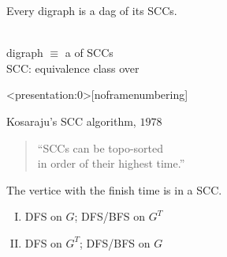 
\begin{frame}{}
  \begin{theorem}
    Every digraph is a dag of its SCCs.
  \end{theorem}

  \pause
  \vspace{0.60cm}
  \begin{center}
     \\[15pt] 

    digraph $\equiv$ a  of SCCs \\[6pt]

    SCC: equivalence class over 
  \end{center}
\end{frame}

\begin{frame}<presentation:0>[noframenumbering]
  \centerline{}

  \vspace{0.50cm}
  \begin{exampleblock}{Kosaraju's SCC algorithm, $1978$}
    \begin{quote}
      \begin{center}
	{\large ``SCCs can be topo-sorted \\[3pt] in  order of their highest  time.''}
      \end{center}
    \end{quote}

    \pause
    \centerline{The vertice with the  finish time is in a  SCC.}
  \end{exampleblock}

  \pause
  \vspace{0.60cm}
  \begin{enumerate}[(I)]
    \centering
  \item DFS on $G$; \; DFS/BFS on $G^{T}$ \\[8pt]
      \pause
    \item DFS on $G^{T}$;\; DFS/BFS on $G$
  \end{enumerate}
\end{frame}


